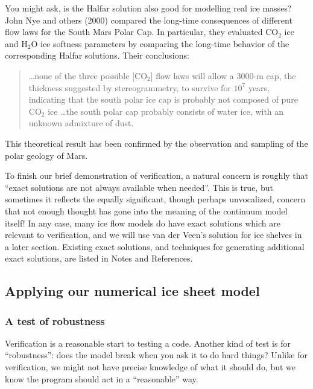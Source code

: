 \documentclass[titlepage,letterpaper,final,12pt]{scrartcl}
\begin{document}
You might ask, is the Halfar solution also good for modelling real ice masses?  John Nye and others (2000)
compared the long-time consequences of different flow laws for the South Mars Polar Cap.  In particular, they evaluated $\text{CO}_2$ ice and $\text{H}_2\text{O}$ ice softness parameters by comparing the long-time behavior of the corresponding Halfar solutions.  Their conclusions:
  \begin{quote}
  \dots none of the three possible [$\text{CO}_2$] flow laws will allow a 3000-m cap, the thickness suggested by stereogrammetry, to survive for $10^7$ years, indicating that the south polar ice cap is probably not composed of pure $\text{CO}_2$ ice \dots the south polar cap probably consists of water ice, with an unknown admixture of dust.
  \end{quote}
This theoretical result has been confirmed by the observation and sampling of the polar geology of Mars.

To finish our brief demonstration of verification, a natural concern is roughly that ``exact solutions are not always available when needed''.  This is true, but sometimes it reflects the equally significant, though perhaps unvocalized, concern that not enough thought has gone into the meaning of the continuum model itself!  In any case, many ice flow models do have exact solutions which are relevant to verification, and we will use van der Veen's solution for ice shelves in a later section.  Existing exact solutions, and techniques for generating additional exact solutions, are listed in Notes and References.


\subsection{Applying our numerical ice sheet model}

\subsubsection*{A test of robustness}  Verification is a reasonable start to testing a code.  Another kind of test is for ``robustness'': does the model break when you ask it to do hard things?  Unlike for verification, we might not have precise knowledge of what it should do, but we know the program should act in a ``reasonable'' way.
\end{document}
